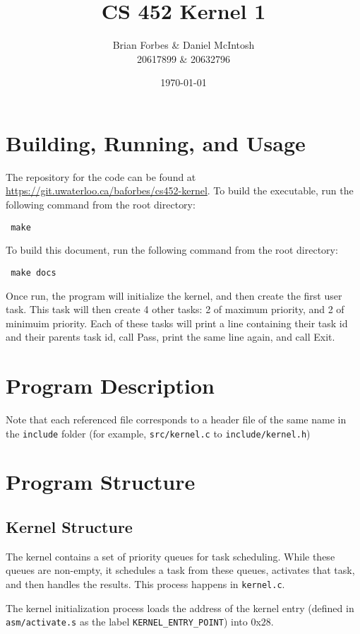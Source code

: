 \documentclass{article}
\begin{document}
\title{CS 452 Kernel 1}
\author{Brian Forbes \& Daniel McIntosh \\ 20617899 \& 20632796}
\date{\today}

\maketitle

\section{Building, Running, and Usage}

The repository for the code can be found at \url{https://git.uwaterloo.ca/baforbes/cs452-kernel}. 
To build the executable, run the following command from the root directory: \begin{verbatim} make \end{verbatim}
To build this document, run the following command from the root directory: \begin{verbatim} make docs \end{verbatim}

Once run, the program will initialize the kernel, and then create the first user task. This task will then create 4 other tasks: 2 of maximum priority, and 2 of minimuim priority. Each of these tasks will print a line containing their task id and their parents task id, call Pass, print the same line again, and call Exit.

\section{Program Description}
Note that each referenced file corresponds to a header file of the same name in the \verb|include| folder (for example, \verb|src/kernel.c| to \verb|include/kernel.h|)

\section{Program Structure}
\subsection{Kernel Structure}
The kernel contains a set of priority queues for task scheduling. While these queues are non-empty, it schedules a task from these queues, activates that task, and then handles the results. This process happens in \verb|kernel.c|.

The kernel initialization process loads the address of the kernel entry (defined in \verb|asm/activate.s| as the label \verb|KERNEL_ENTRY_POINT|) into $0$x$28$.
\end{document}
